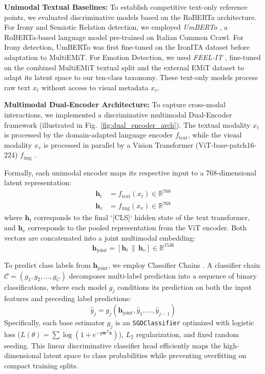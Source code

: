 \noindent\textbf{Unimodal Textual Baselines:} To establish competitive text-only reference points, we evaluated discriminative models based on the RoBERTa architecture. For Irony and Semiotic Relation detection, we employed \textit{UmBERTo} \cite{musixmatch-2020-umberto}, a RoBERTa-based language model pre-trained on Italian Common Crawl. For Irony detection, UmBERTo was first fine-tuned on the IronITA dataset \cite{ironita2018} before adaptation to MultiEMiT. For Emotion Detection, we used \textit{FEEL-IT} \cite{bianchi2021feel}, fine-tuned on the combined MultiEMiT textual split and the external EMiT dataset \cite{emit} to adapt its latent space to our ten-class taxonomy. These text-only models process raw text $x_t$ without access to visual metadata $x_v$.

\noindent\textbf{Multimodal Dual-Encoder Architecture:} To capture cross-modal interactions, we implemented a discriminative multimodal Dual-Encoder framework (illustrated in Fig.~\ref{fig:dual_encoder_arch}). 
The textual modality $x_t$ is processed by the domain-adapted language encoder $f_{\text{text}}$, while the visual modality $x_v$ is processed in parallel by a Vision Transformer (ViT-base-patch16-224) $f_{\text{img}}$ \cite{dosovitskiy2021vit}.

Formally, each unimodal encoder maps its respective input to a 768-dimensional latent representation:
\begin{align}
\mathbf{h}_t &= f_{\text{text}}(x_t) \in \mathbb{R}^{768} \\
\mathbf{h}_v &= f_{\text{img}}(x_v) \in \mathbb{R}^{768}
\end{align}
where $\mathbf{h}_t$ corresponds to the final `[CLS]` hidden state of the text transformer, and $\mathbf{h}_v$ corresponds to the pooled representation from the ViT encoder. Both vectors are concatenated into a joint multimodal embedding:
\begin{equation}
\label{eq:joint_embedding}
\mathbf{h}_{\text{joint}} = [\mathbf{h}_t \,\|\, \mathbf{h}_v] \in \mathbb{R}^{1536}
\end{equation}

To predict class labels from $\mathbf{h}_{\text{joint}}$, we employ Classifier Chains \cite{pedregosa2011scikit}. A classifier chain $\mathcal{C} = (g_1, g_2, \dots, g_C)$ decomposes multi-label prediction into a sequence of binary classifications, where each model $g_j$ conditions its prediction on both the input features and preceding label predictions:
\begin{equation}
\label{eq:classifier_chains}
\hat{y}_j = g_j(\mathbf{h}_{\text{joint}}, \hat{y}_1, \dots, \hat{y}_{j-1})
\end{equation}
Specifically, each base estimator $g_j$ is an \texttt{SGDClassifier} optimized with logistic loss ($L(\theta) = \sum \log(1 + e^{-y \mathbf{w}^T \mathbf{x}})$), $L_2$ regularization, and fixed random seeding. This linear discriminative classifier head efficiently maps the high-dimensional latent space to class probabilities while preventing overfitting on compact training splits.

